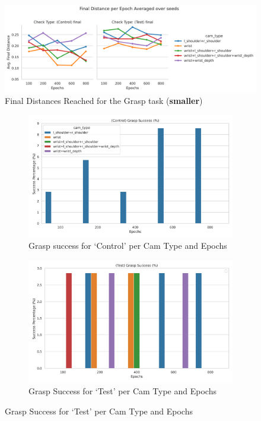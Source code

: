 \begin{figure}[H]
  \centering
  \includegraphics[width=\linewidth]{assets/evaluation/baseline/base-grasp-final-smaller.png}
  \caption{Final Distances Reached for the Grasp task (\textbf{smaller})}\label{fig:base-grasp-final-smaller}
\end{figure}

\begin{figure}[H]
  \centering
  \begin{subfigure}{0.45\linewidth}
    \centering
    \includegraphics[width=\linewidth]{assets/evaluation/baseline/base-smaller-grasp-control-success-cams-epochs.png}
    \caption{Grasp success for `Control' per Cam Type and Epochs }\label{subfig:base-grasp-control-success-smaller}
  \end{subfigure}
  \hfill
  \begin{subfigure}{0.45\linewidth}
    \centering
    \includegraphics[width=\linewidth]{assets/evaluation/baseline/base-smaller-grasp-test-success-cams-epochs.png}
    \caption{Grasp Success for `Test' per Cam Type and Epochs}\label{subfig:base-grasp-test-success-smaller}
  \end{subfigure}
  

\end{figure}
